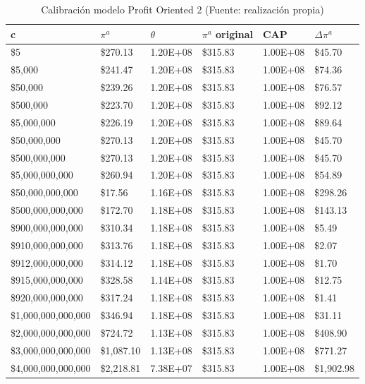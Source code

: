 \begin{table}[H]
    \centering
    \begin{tabular}{|l|l|l|l|l|l|}
    \hline
        c & $\pi^a$ & $\theta$ & $\pi^a$ original &  CAP& $\Delta \pi^a$  \\ \hline
         \$5  &  \$270.13  & 1.20E+08 &  \$315.83  & 1.00E+08 &  \$45.70   \\ \hline
         \$5,000  &  \$241.47  & 1.20E+08 &  \$315.83  & 1.00E+08 &  \$74.36   \\ \hline
         \$50,000  &  \$239.26  & 1.20E+08 &  \$315.83  & 1.00E+08 &  \$76.57   \\ \hline
         \$500,000  &  \$223.70  & 1.20E+08 &  \$315.83  & 1.00E+08 &  \$92.12   \\ \hline
         \$5,000,000  &  \$226.19  & 1.20E+08 &  \$315.83  & 1.00E+08 &  \$89.64   \\ \hline
         \$50,000,000  &  \$270.13  & 1.20E+08 &  \$315.83  & 1.00E+08 &  \$45.70   \\ \hline
         \$500,000,000  &  \$270.13  & 1.20E+08 &  \$315.83  & 1.00E+08 &  \$45.70   \\ \hline
         \$5,000,000,000  &  \$260.94  & 1.20E+08 &  \$315.83  & 1.00E+08 &  \$54.89   \\ \hline
         \$50,000,000,000  &  \$17.56  & 1.16E+08 &  \$315.83  & 1.00E+08 &  \$298.26   \\ \hline
         \$500,000,000,000  &  \$172.70  & 1.18E+08 &  \$315.83  & 1.00E+08 &  \$143.13   \\ \hline
         \$900,000,000,000  &  \$310.34  & 1.18E+08 &  \$315.83  & 1.00E+08 &  \$5.49   \\ \hline
         \$910,000,000,000  &  \$313.76  & 1.18E+08 &  \$315.83  & 1.00E+08 &  \$2.07   \\ \hline
         \$912,000,000,000  &  \$314.12  & 1.18E+08 &  \$315.83  & 1.00E+08 &  \$1.70   \\ \hline
         \$915,000,000,000  &  \$328.58  & 1.14E+08 &  \$315.83  & 1.00E+08 &  \$12.75   \\ \hline
         \$920,000,000,000  &  \$317.24  & 1.18E+08 &  \$315.83  & 1.00E+08 &  \$1.41   \\ \hline
         \$1,000,000,000,000  &  \$346.94  & 1.18E+08 &  \$315.83  & 1.00E+08 &  \$31.11   \\ \hline
         \$2,000,000,000,000  &  \$724.72  & 1.13E+08 &  \$315.83  & 1.00E+08 &  \$408.90   \\ \hline
         \$3,000,000,000,000  &  \$1,087.10  & 1.13E+08 &  \$315.83  & 1.00E+08 &  \$771.27   \\ \hline
         \$4,000,000,000,000  &  \$2,218.81  & 7.38E+07 &  \$315.83  & 1.00E+08 &  \$1,902.98   \\ \hline
    \end{tabular}
    \caption{{\footnotesize Calibración modelo Profit Oriented 2 (Fuente: realización propia)}}
    \label{calibracionPO2}
\end{table}

